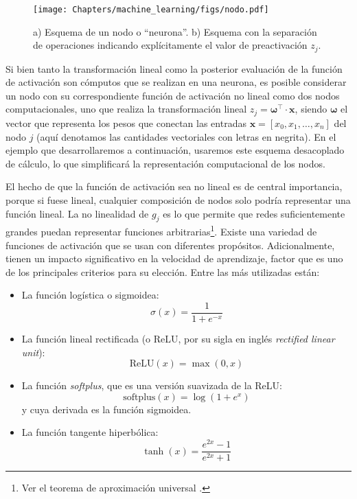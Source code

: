 \begin{figure}[t]
    \begin{center}
    \texttt{[image: Chapters/machine\_learning/figs/nodo.pdf]}
\end{center}
\caption{a) Esquema de un nodo o ``neurona''. b) Esquema con la separación de operaciones indicando explícitamente el valor de preactivación $z_j$.}
\label{fig:nodo}
\end{figure}

Si bien tanto la transformación lineal como la posterior evaluación de la función de activación son cómputos que se realizan en una neurona, es posible considerar un nodo con su correspondiente función de activación no lineal como dos nodos computacionales, uno que realiza la transformación lineal $z_j = \bm{\omega}^{\intercal} \cdot \bm{x}$, siendo $\bm{\omega}$ el vector que representa los pesos que conectan las entradas $\bm{x} = [x_0, x_1, \ldots, x_n]$ del nodo $j$ (aquí denotamos las cantidades vectoriales con letras en negrita). En el ejemplo que desarrollaremos a continuación, usaremos este esquema desacoplado de cálculo, lo que simplificará la representación computacional de los nodos.

El hecho de que la función de activación sea no lineal es de central importancia, porque si fuese lineal, cualquier composición de nodos solo podría representar una función lineal. La no linealidad de $g_j$ es lo que permite que redes suficientemente grandes puedan representar funciones arbitrarias\footnote{Ver el teorema de aproximación universal \cite{cybenko1989, hornik1991,leshno1993}.}. Existe una variedad de funciones de activación que se usan con diferentes propósitos. Adicionalmente, tienen un impacto significativo en la velocidad de aprendizaje, factor que es uno de los principales criterios para su elección. Entre las más utilizadas están:
\begin{itemize}
    \item La función logística o sigmoidea:
        \[\sigma(x) = \frac{1}{1 + e^{-x}} \]
    \item La función lineal rectificada (o ReLU, por su sigla en inglés \textit{rectified linear unit}):
        \[ \text{ReLU}(x) = \max(0, x) \]
    \item La función \textit{softplus}, que es una versión suavizada de la ReLU:
        \[ \text{softplus}(x) = \log(1 + e^x) \]
        y cuya derivada es la función sigmoidea.
    \item La función tangente hiperbólica: 
        \[ \tanh(x) = \frac{e^{2x} - 1}{e^{2x} + 1} \]
\end{itemize}


